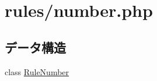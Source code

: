 \hypertarget{number_8php}{
\section{rules/number.php}
\label{number_8php}
}
\subsection*{データ構造}
\begin{DoxyCompactItemize}
\item 
class \hyperlink{class_rule_number}{\-Rule\-Number}
\end{DoxyCompactItemize}
